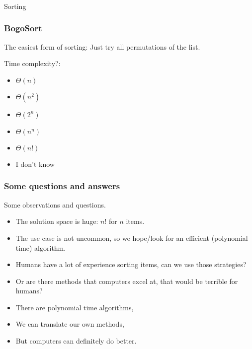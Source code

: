 \begin{frame}[fragile]\frametitle{}
\begin{center}
{\Large Sorting}
\end{center}

\end{frame}

\begin{frame}
	\frametitle{BogoSort}
			The easiest form of sorting: Just try all permutations of the list.
		
Time complexity?:
			\begin{itemize}
				\item $\Theta(n)$
				\item $\Theta(n^2)$
				\item $\Theta(2^n)$
				\item $\Theta(n^n)$
				\item $\Theta(n!)$
				\item I don't know
			\end{itemize}
\end{frame}

\begin{frame}
	\frametitle{Some questions and answers}
	Some observations and questions.
	\begin{itemize}
		\item The solution space is huge: $n!$ for $n$ items.
			
		\item The use case is not uncommon, so we hope/look for an efficient (polynomial time) algorithm.
			
		\item Humans have a lot of experience sorting items, can we use those strategies?
			
		\item Or are there methods that computers excel at, that would be terrible for humans?
	\end{itemize}

	\begin{itemize}
		\item There are polynomial time algorithms,
			
		\item We can translate our own methods,
		\item But computers can definitely do better.
	\end{itemize}
\end{frame}

